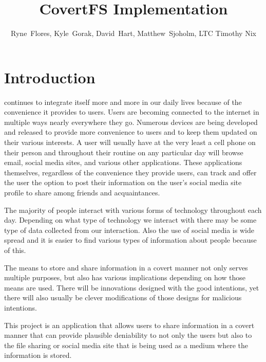 \documentclass[12pt,journal,compsoc]{IEEEtran}
\title{CovertFS Implementation}
\author{Ryne~Flores, Kyle~Gorak, David~Hart, Matthew~Sjoholm, LTC Timothy Nix \\ \IEEEmembership{Department of Electrical Engineering and Computer Science\\ United States Military Academy}}
\date{}
\begin{document}
\maketitle

\section{Introduction}



 continues to integrate itself more and more in our daily lives because of the convenience it provides to users. Users are becoming connected to the internet in multiple ways nearly everywhere they go. Numerous devices are being developed and released to provide more convenience to users and to keep them updated on their various interests. A user will usually have at the very least a cell phone on their person and throughout their routine on any particular day will browse email, social media sites, and various other applications. These applications themselves, regardless of the convenience they provide users, can track and offer the user the option to post their information on the user's social media site profile to share among friends and acquaintances.

The majority of people interact with various forms of technology throughout each day. Depending on what type of technology we interact with there may be some type of data collected from our interaction. Also the use of social media is wide spread and it is easier to find various types of information about people because of this. 

The means to store and share information in a covert manner not only serves multiple purposes, but also has various implications depending on how those means are used. There will be innovations designed with the good intentions, yet there will also usually be clever modifications of those designs for malicious intentions.

This project is an application that allows users to share information in a covert manner that can provide plausible deniability to not only the users but also to the file sharing or social media site that is being used as a medium where the information is stored.
\end{document}
